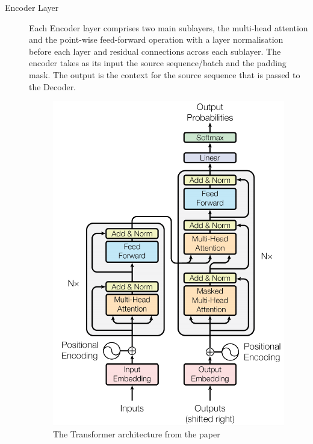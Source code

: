 \documentclass[12pt,a4paper,twoside,openright]{report}
\newenvironment{specialfootnote}
    {
    \renewcommand*{\thefootnote}{\fnsymbol{footnote}}
    }
    {
    \renewcommand*{\thefootnote}{\arabic{footnote}}
    }
\begin{document}
\begin{description}
\begin{specialfootnote}
\item[Encoder Layer]
Each Encoder layer comprises two main sublayers, the multi-head attention and the point-wise feed-forward operation with a layer normalisation before each layer and residual connections across each sublayer. The encoder takes as its input the source sequence/batch and the padding mask\footnotemark[8]. The output is the context for the source sequence that is passed to the Decoder.

\begin{figure}[H]
    \centering
    \includegraphics[width=\textwidth/2]{figs/transformer-architecture.PNG}
    \caption{The Transformer architecture from the paper\cite{transformers}}
    \label{fig:transformer-architecture}
\end{figure}


\end{specialfootnote}
\end{description}
\end{document}
